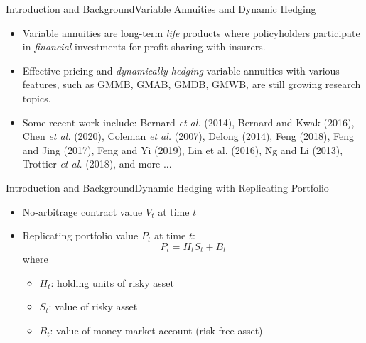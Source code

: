 \documentclass[10pt]{beamer}
\theoremstyle{definition}
\begin{document}
\begin{frame}{Introduction and Background}{Variable Annuities and Dynamic Hedging}
\begin{itemize}
\item Variable annuities are long-term {\it life} products where policyholders participate in {\it financial} investments for profit sharing with insurers.

\item Effective pricing and {\it dynamically hedging} variable annuities with various features, such as GMMB, GMAB, GMDB, GMWB, are still growing research topics.

\item Some recent work include: Bernard {\it et al.} (2014), Bernard and Kwak (2016), Chen {\it et al.} (2020), Coleman {\it et al.} (2007), Delong (2014), Feng (2018), Feng and Jing (2017), Feng and Yi (2019), Lin {et al.} (2016), Ng and Li (2013), Trottier {\it et al.} (2018), and more ...
\end{itemize}
\end{frame}

\begin{frame}{Introduction and Background}{Dynamic Hedging with Replicating Portfolio}
\begin{itemize}
\item No-arbitrage contract value $V_t$ at time $t$
\item Replicating portfolio value $P_t$ at time $t$:
$$P_t=H_tS_t+B_t$$
where
\begin{itemize}
\item $H_t$: holding units of risky asset
\item $S_t$: value of risky asset
\item $B_t$: value of money market account (risk-free asset)
\end{itemize}
\end{itemize}
\begin{center}
\end{center}
\end{frame}
\end{document}
